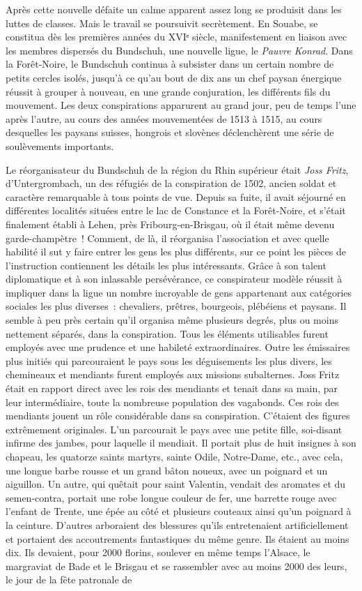 \documentclass[french,twoside]{book} %
\begin{document}
Après cette nouvelle défaite un calme apparent assez long se produisit dans les luttes de classes. Mais le travail se poursuivit secrètement. En Souabe, se constitua dès les premières années du XVIᵉ siècle, manifestement en liaison avec les membres dispersés du Bundschuh, une nouvelle ligue, le \emph{Pauvre Konrad}. Dans la Forêt-Noire, le Bundschuh continua à subsister dans un certain nombre de petits cercles isolés, jusqu’à ce qu’au bout de dix ans un chef paysan énergique réussit à grouper à nouveau, en une grande conjuration, les différents fils du mouvement. Les deux conspirations apparurent au grand jour, peu de temps l’une après l’autre, au cours des années mouvementées de 1513 à 1515, au cours desquelles les paysans suisses, hongrois et slovènes déclenchèrent une série de soulèvements importants.\par
Le réorganisateur du Bundschuh de la région du Rhin supérieur était \emph{Joss Fritz}, d’Untergrombach, un des réfugiés de la conspiration de 1502, ancien soldat et caractère remarquable à tous points de vue. Depuis sa fuite, il avait séjourné en différentes localités situées entre le lac de Constance et la Forêt-Noire, et s’était finalement établi à Lehen, près Fribourg-en-Brisgau, où il était même devenu garde-champètre ! Comment, de là, il réorganisa l’association et avec quelle habilité il sut y faire entrer les gens les plus différents, sur ce point les pièces de l’instruction contiennent les détails les plus intéressants. Grâce à son talent diplomatique et à son inlassable persévérance, ce conspirateur modèle réussit à impliquer dans la ligue un nombre incroyable de gens appartenant aux catégories sociales les plus diverses : chevaliers, prêtres, bourgeois, plébéiens et paysans. Il semble à peu près certain qu’il organisa même plusieurs degrés, plus ou moins nettement séparés, dans la conspiration. Tous les éléments utilisables furent employés avec une prudence et une habileté extraordinaires. Outre les émissaires plus initiés qui parcouraient le pays sous les déguisements les plus divers, les chemineaux et mendiants furent employés aux missions subalternes. Joss Fritz était en rapport direct avec les rois des mendiants et tenait dans sa main, par leur intermédiaire, toute la nombreuse population des vagabonds. Ces rois des mendiants jouent un rôle considérable dans sa conspiration. C’étaient des figures extrêmement originales. L’un parcourait le pays avec une petite fille, soi-disant infirme des jambes, pour laquelle il mendiait. Il portait plus de huit insignes à son chapeau, les quatorze saints martyrs, sainte Odile, Notre-Dame, etc., avec cela, une longue barbe rousse et un grand bâton noueux, avec un poignard et un aiguillon. Un autre, qui quêtait pour saint Valentin, vendait des aromates et du semen-contra, portait une robe longue couleur de fer, une barrette rouge avec l’enfant de Trente, une épée au côté et plusieurs couteaux ainsi qu’un poignard à la ceinture. D’autres arboraient des blessures qu’ils entretenaient artificiellement et portaient des accoutrements fantastiques du même genre. Ils étaient au moins dix. Ils devaient, pour 2000 florins, soulever en même temps l’Alsace, le margraviat de Bade et le Brisgau et se rassembler avec au moins 2000 des leurs, le jour de la fête patronale de 
\end{document}
